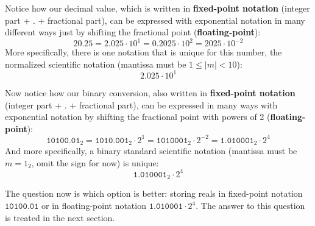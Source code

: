 Notice how our decimal value, which is written in \textbf{fixed-point notation} (integer part + . + fractional part), can be expressed with exponential notation in many different ways just by shifting the fractional point (\textbf{floating-point}):
$$
20.25 = 2.025\cdot10^1 = 0.2025\cdot10^2 = 2025\cdot10^{-2}
$$
More specifically, there is one notation that is unique for this number, the normalized scientific notation (mantissa must be $1\leq\mid m \mid < 10$):
$$
2.025\cdot10^1
$$

Now notice how our binary conversion, also written in \textbf{fixed-point notation} (integer part + . + fractional part), can be expressed in many ways with exponential notation by shifting the fractional point with powers of 2 (\textbf{floating-point}):
$$
\texttt{10100.01}_{2} = \texttt{1010.001}_{2}\cdot2^1  = \texttt{1010001}_{2}\cdot2^{-2} = \texttt{1.010001}_{2}\cdot2^4
$$
And more specifically, a binary standard scientific notation (mantissa must be $m = 1_2$, omit the sign for now) is unique:
$$
\texttt{1.010001}_{2}\cdot2^4
$$

The question now is which option is better: storing reals in fixed-point notation $\texttt{10100.01}$ or in floating-point notation $\texttt{1.010001}\cdot2^4$.
The answer to this question is treated in the next section. 








